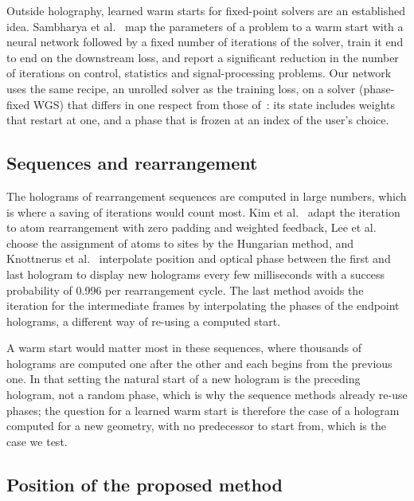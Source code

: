 Outside holography, learned warm starts for fixed-point solvers are an established idea. Sambharya et al.~\cite{sambharya} map the parameters of a problem to a warm start with a neural network followed by a fixed number of iterations of the solver, train it end to end on the downstream loss, and report a significant reduction in the number of iterations on control, statistics and signal-processing problems.
Our network uses the same recipe, an unrolled solver as the training loss, on a solver (phase-fixed WGS) that differs in one respect from those of~\cite{sambharya}: its state includes weights that restart at one, and a phase that is frozen at an index of the user's choice.

\subsection{Sequences and rearrangement}\label{sec:rel-seq}

The holograms of rearrangement sequences are computed in large numbers, which is where a saving of iterations would count most. Kim et al.~\cite{kimoe} adapt the iteration to atom rearrangement with zero padding and weighted feedback, Lee et al.~\cite{lee} choose the assignment of atoms to sites by the Hungarian method, and Knottnerus et al.~\cite{lpi}
interpolate position and optical phase between the first and last hologram to display new holograms every few milliseconds with a success probability of 0.996 per rearrangement cycle. The last method avoids the iteration for the intermediate frames by interpolating the phases of the endpoint holograms, a different way of re-using a computed start.

A warm start would matter most in these sequences, where thousands of holograms are computed one after the other and each begins from the previous one. In that setting the natural start of a new hologram is the preceding hologram, not a random phase, which is why the sequence methods already re-use phases; the question for a learned warm start is therefore the case of a hologram computed for a new geometry, with no predecessor to start from, which is the case we test.

\subsection{Position of the proposed method}\label{sec:rel-position}

